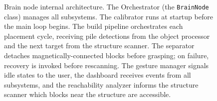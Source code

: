 \begin{figure}[H]
\caption{Brain node internal architecture. The Orchestrator (the \texttt{BrainNode} class) manages all subsystems. The calibrator runs at startup before the main loop begins. The build pipeline orchestrates each placement cycle, receiving pile detections from the object processor and the next target from the structure scanner. The separator detaches magnetically-connected blocks before grasping; on failure, recovery is invoked before rescanning. The gesture manager signals idle states to the user, the dashboard receives events from all subsystems, and the reachability analyzer informs the structure scanner which blocks near the structure are accessible.}
\label{fig:brain_internals}
\end{figure}
